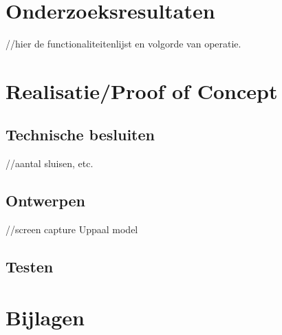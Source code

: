 \documentclass{article}
\begin{document}
\section{Onderzoeksresultaten}
//hier de functionaliteitenlijst en volgorde van operatie.
\section{Realisatie/Proof of Concept}

\subsection{Technische besluiten}
//aantal sluisen, etc.
\subsection{Ontwerpen}
//screen capture Uppaal model
\subsection{Testen}

\section{Bijlagen}
\newpage


\end{document}
